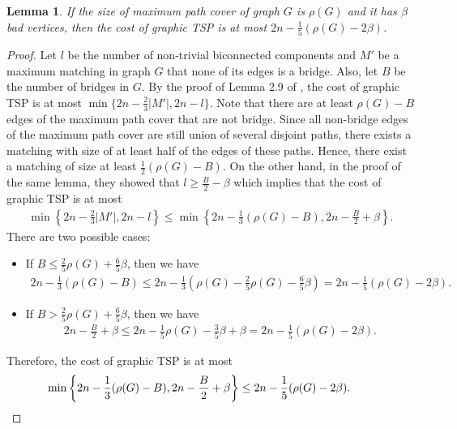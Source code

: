 \documentclass[letterpaper,11pt]{article}
\newtheorem{lemma}[theorem]{Lemma}
\newenvironment{myproof}{
\vspace{-0.5cm}
\begin{proof}
}{
\end{proof}
}
\begin{document}
\begin{lemma}\label{lem:bound-path-cover-bad-vertices-tsp}
If the size of maximum path cover of graph $G$ is $\rho(G)$ and it has $\beta$ bad vertices, then the cost of graphic TSP is at most $2n - \frac{1}{5}(\rho(G) - 2\beta)$.
\end{lemma}
\begin{myproof}
Let $l$ be the number of non-trivial biconnected components and $M'$ be a maximum matching in graph $G$ that none of its edges is a bridge. Also, let $B$ be the number of bridges in $G$. By the proof of Lemma 2.9 of \cite{chen2020}, the cost of graphic TSP is at most $\min\{2n - \frac{2}{3}|M'|, 2n - l\}$. Note that there are at least $\rho(G) - B$ edges of the maximum path cover that are not bridge. Since all non-bridge edges of the maximum path cover are still union of several disjoint paths, there exists a matching with size of at least half of the edges of these paths. Hence, there exist a matching of size at least $\frac{1}{2}(\rho(G) - B)$. On the other hand, in the proof of the same lemma, they showed that $l \geq \frac{B}{2} - \beta$ which implies that the cost of graphic TSP is at most
\begin{align*}
\min\left\{2n - \frac{2}{3}|M'|, 2n - l\right\} \leq \min\left\{2n - \frac{1}{3}(\rho(G) - B), 2n - \frac{B}{2} + \beta\right\}.
\end{align*}
There are two possible cases:
\begin{itemize}
    \item If $B \leq \frac{2}{5}\rho(G) + \frac{6}{5}\beta$, then we have 
    \begin{align*}
        2n - \frac{1}{3}(\rho(G) - B) \leq 2n - \frac{1}{3}(\rho(G) - \frac{2}{5}\rho(G) - \frac{6}{5}\beta) = 2n - \frac{1}{5}(\rho(G) - 2\beta).
    \end{align*}
    \item If $B > \frac{2}{5}\rho(G) + \frac{6}{5}\beta$, then we have
    \begin{align*}
        2n - \frac{B}{2} + \beta \leq 2n - \frac{1}{5}\rho(G) - \frac{3}{5}\beta + \beta = 2n - \frac{1}{5}(\rho(G) - 2\beta).
    \end{align*}
\end{itemize}
Therefore, the cost of graphic TSP is at most
\begin{align*}
    \min\left\{2n - \frac{1}{3}(\rho(G) - B), 2n - \frac{B}{2} + \beta\right\} \leq 2n - \frac{1}{5}(\rho(G) - 2\beta). \qquad \qedhere
\end{align*}
\end{myproof}
\end{document}
